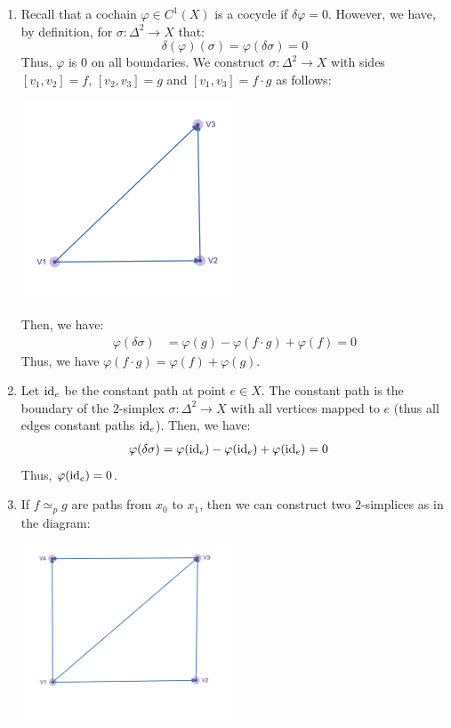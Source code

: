 \documentclass[12pt]{article}
\begin{document}
\begin{solution}
    \bbni
    \begin{enumerate}
        \item Recall that a cochain $\varphi \in C^1(X)$ is a cocycle if $\delta \varphi = 0$. However, we have, by definition, for $\sigma: \Delta^2 \to X$ that: 
        \[ \delta(\varphi)(\sigma) = \varphi(\delta \sigma) = 0\]
        Thus, $\varphi$ is $0$ on all boundaries. \bbni
        We construct $\sigma: \Delta^2 \to X$ with sides $[v_1, v_2] = f$, $[v_2, v_3] = g$ and $[v_1, v_3] = f \cdot g$ as follows: \bbni
        \begin{centering}
            \includegraphics[width=0.5\textwidth]{assets/hwk9_21.png}
        \end{centering}
        \bbni
        Then, we have: 
        \begin{align*}
            \varphi(\delta \sigma) &= \varphi(g) - \varphi(f \cdot g) + \varphi(f) = 0
        \end{align*}
        Thus, we have $\varphi(f \cdot g) = \varphi(f) + \varphi(g)$.
        \item Let $\operatorname{id}_e$ be the constant path at point $e \in X$. The constant path is the boundary of the 2-simplex $\sigma: \Delta^2 \to X$ with all vertices mapped to $e$ (thus all edges constant paths $\operatorname{id}_{e}$). Then, we have:
        \begin{align*}
            \varphi(\delta \sigma) &= \varphi(\operatorname{id}_e) - \varphi(\operatorname{id}_e) + \varphi(\operatorname{id}_e) = 0
        \end{align*}
        Thus, $\varphi(\operatorname{id}_e) = 0$.
        \item If $f \simeq_p g$ are paths from $x_0$ to $x_1$, then we can construct two $2$-simplices as in the diagram: \bbni
        \begin{centering}
            \includegraphics[width=0.5\textwidth]{assets/hwk9_22.png}

\end{centering}
\end{enumerate}
\end{solution}
\end{document}
